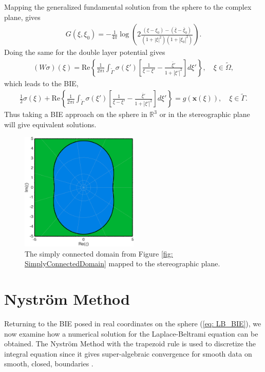 \documentclass{sfuthesis}
\begin{document}
Mapping the generalized fundamental solution from the sphere to the complex plane, gives \cite{SurCrow2008}  
\begin{align*}
	G(\xi, \xi_0)=-\frac{1}{4\pi} \log \left(2 \frac{(\xi -\xi_0)-(\bar{\xi}- \bar{\xi}_0)}{(1+{|\xi|}^2)(1+{|\xi_0|}^2)}\right).
\end{align*}
Doing the same for the double layer potential gives \cite{KropNig2014} 
\begin{align*}
	(W\sigma)(\xi)=\text{Re}\left\{\frac{1}{2\pi i}\int_{\tilde{\Gamma}} \sigma(\xi ')\left[\frac{1}{\xi -\xi '} - \frac{\bar{\xi} ' }{1+ {|\xi '|}^2}\right] d\xi ' \right\}, \quad \xi \in \tilde{\Omega},
\end{align*}
which leads to the BIE, \cite{KropNig2014}
\begin{align*}
	\frac{1}{2}\sigma(\xi)+\text{Re}\left\{\frac{1}{2\pi i}\int_{\tilde{\Gamma}} \sigma(\xi ')\left[\frac{1}{\xi -\xi '} - \frac{\bar{\xi} ' }{1+ {|\xi '|}^2}\right] d\xi ' \right\}= g(\mathbf{x}(\xi)), \quad \xi \in \tilde{\Gamma}. 
\end{align*}
Thus taking a BIE approach on the sphere in $\mathbb{R}^3$ or in the stereographic plane will give equivalent solutions. 

\begin{figure}[h]  
	\centering
	\includegraphics[width=0.5\textwidth]{SimplyConnectedStereo}
	\caption{The simply connected domain from Figure \ref{fig: SimplyConnectedDomain} mapped to the stereographic plane. }
	\label{fig: SimplyConnectedStereo}
\end{figure}

\section{Nystr\"{o}m Method}
\label{sec: Nystrom}
Returning to the BIE posed in real coordinates on the sphere (\ref{eq: LB_BIE}), we now examine how a numerical solution for the Laplace-Beltrami equation can be obtained. The Nystr\"{o}m Method with the trapezoid rule is used to discretize the integral equation since it gives super-algebraic convergence for smooth data on smooth, closed, boundaries \cite{Atk97, Kress99}. 
\end{document}
